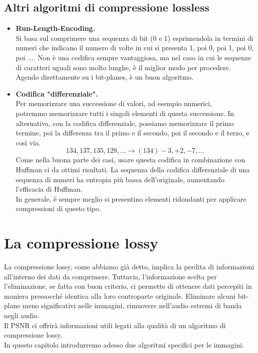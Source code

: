 \documentclass{report}
\begin{document}
	\subsection{Altri algoritmi di compressione lossless}
	\begin{itemize}
		\item \textbf{Run-Length-Encoding.}\\
		      Si basa sul comprimere una sequenza di bit (0 e 1) esprimendola in termini di numeri che indicano il numero di volte in cui si presenta 1, poi 0, poi 1, poi 0, poi $\dots$. Non è una codifica sempre vantaggiosa, ma nel caso in cui le sequenze di caratteri uguali sono molto lunghe, è il miglior modo per procedere. Agendo direttamente su i bit-planes, è un buon algoritmo.
		      		      
		\item \textbf{Codifica "differenziale".}\\
		      Per memorizzare una successione di valori, ad esempio numerici, \\potremmo memorizzare tutti i singoli elementi di questa successione. In alternativa, con la codifica differenziale, possiamo memorizzare il primo termine, poi la differenza tra il primo e il secondo, poi il secondo e il terzo, e così via.
		      $$
		      134,137,135,128, \dots \rightarrow(134) -3,+2,-7, \dots
		      $$
		      Come nella buona parte dei casi, usare questa codifica in combinazione con Huffman ci da ottimi risultati. La sequenza della codifica differenziale di una sequenza di numeri ha entropia più bassa dell'originale, aumentando l'efficacia di Huffman.\\
		      In generale, è sempre meglio si presentino elementi ridondanti per applicare compressioni di questo tipo.
	\end{itemize}
		
	\newpage 
		
	\section{La compressione lossy}
	La compressione lossy, come abbiamo già detto, implica la perdita di informazioni all'interno dei dati da comprimere. Tuttavia, l'informazione scelta per l'eliminazione, se fatta con buon criterio, ci permette di ottenere dati percepiti in maniera pressocché identica alla loro controparte originale. Eliminare alcuni bit-plane meno significativi nelle immagini, rimuovere nell'audio estremi di banda negli audio.\\
	Il PSNR ci offrirà informazioni utili legati alla qualità di un algoritmo di compressione lossy.\\
	In questo capitolo introdurremo adesso due algoritmi specifici per le immagini.
\end{document}

